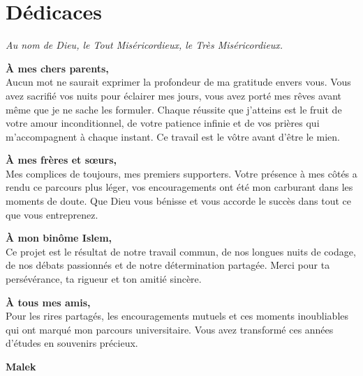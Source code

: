 \chapter*{\Huge Dédicaces}

\vspace{1cm}

\begin{center}

    \textit{Au nom de Dieu, le Tout Miséricordieux, le Très Miséricordieux.}

    \vspace{0.8cm}

    \textbf{À mes chers parents,}\\[0.3cm]
    Aucun mot ne saurait exprimer la profondeur de ma gratitude envers vous.
    Vous avez sacrifié vos nuits pour éclairer mes jours, vous avez porté mes rêves
    avant même que je ne sache les formuler. Chaque réussite que j'atteins
    est le fruit de votre amour inconditionnel, de votre patience infinie
    et de vos prières qui m'accompagnent à chaque instant.
    Ce travail est le vôtre avant d'être le mien.

    \vspace{0.7cm}

    \textbf{À mes frères et sœurs,}\\[0.3cm]
    Mes complices de toujours, mes premiers supporters.
    Votre présence à mes côtés a rendu ce parcours plus léger,
    vos encouragements ont été mon carburant dans les moments de doute.
    Que Dieu vous bénisse et vous accorde le succès dans tout ce que vous entreprenez.

    \vspace{0.7cm}

    \textbf{À mon binôme Islem,}\\[0.3cm]
    Ce projet est le résultat de notre travail commun, de nos longues nuits
    de codage, de nos débats passionnés et de notre détermination partagée.
    Merci pour ta persévérance, ta rigueur et ton amitié sincère.

    \vspace{0.7cm}

    \textbf{À tous mes amis,}\\[0.3cm]
    Pour les rires partagés, les encouragements mutuels et ces moments
    inoubliables qui ont marqué mon parcours universitaire.
    Vous avez transformé ces années d'études en souvenirs précieux.

    \vspace{1cm}

    \textbf{Malek}

\end{center}
